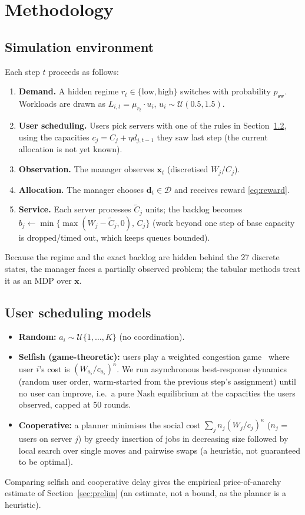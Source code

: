 \documentclass{article}
\newcommand{\Ct}{\tilde{C}}
\begin{document}
\section{Methodology}\label{sec:method}
\subsection{Simulation environment}\label{sec:env}
Each step $t$ proceeds as follows:
\begin{enumerate}
\item \textbf{Demand.} A hidden regime $r_t\in\{\text{low},\text{high}\}$ switches with
probability $p_{\text{sw}}$. Workloads are drawn as
$L_{i,t}=\mu_{r_t}\cdot u_i$, $u_i\sim\mathcal U(0.5,1.5)$.
\item \textbf{User scheduling.} Users pick servers with one of the rules in
Section~\ref{sec:users}, using the capacities $c_j=C_j+\eta d_{j,t-1}$ they saw last step
(the current allocation is not yet known).
\item \textbf{Observation.} The manager observes $\bm x_t$ (discretised $W_j/C_j$).
\item \textbf{Allocation.} The manager chooses $\bm d_t\in\mathcal D$ and receives reward
\eqref{eq:reward}.
\item \textbf{Service.} Each server processes $\Ct_j$ units; the backlog becomes
$b_j\leftarrow\min\{\max(W_j-\Ct_j,0),\,C_j\}$ (work beyond one step of base capacity is
dropped/timed out, which keeps queues bounded).
\end{enumerate}
Because the regime and the exact backlog are hidden behind the 27 discrete states, the
manager faces a partially observed problem; the tabular methods treat it as an MDP over
$\bm x$.

\subsection{User scheduling models}\label{sec:users}
\begin{itemize}
\item \textbf{Random:} $a_i\sim\mathcal U\{1,\dots,K\}$ (no coordination).
\item \textbf{Selfish (game-theoretic):} users play a weighted congestion
game~\cite{rosenthal1973} where user $i$'s cost is $(W_{a_i}/c_{a_i})^\kappa$. We run
asynchronous best-response dynamics (random user order, warm-started from the previous
step's assignment) until no user can improve, i.e.\ a pure Nash equilibrium at the
capacities the users observed, capped at 50 rounds.
\item \textbf{Cooperative:} a planner minimises the social cost
$\sum_j n_j (W_j/c_j)^\kappa$ ($n_j$ = users on server $j$) by greedy insertion of jobs in
decreasing size followed by local search over single moves and pairwise swaps (a
heuristic, not guaranteed to be optimal).
\end{itemize}
Comparing selfish and cooperative delay gives the empirical price-of-anarchy estimate of
Section~\ref{sec:prelim} (an estimate, not a bound, as the planner is a heuristic).
\end{document}

